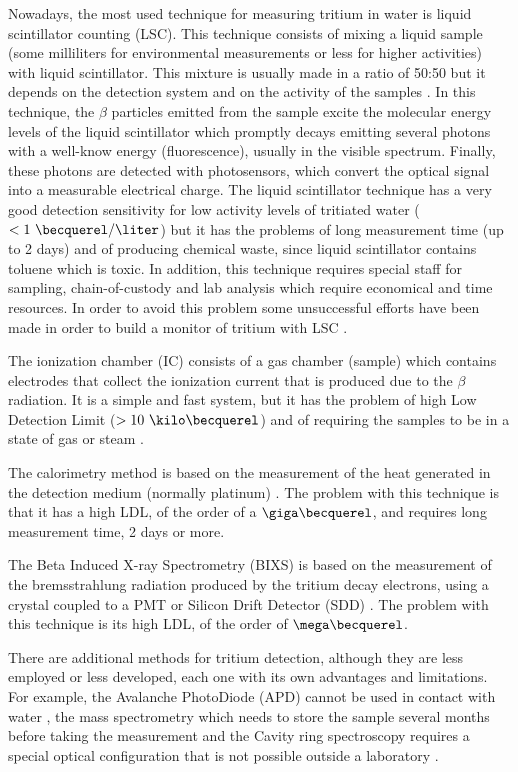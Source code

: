 Nowadays, the most used technique for measuring tritium in water is liquid scintillator counting (LSC). This technique consists of mixing a liquid sample (some milliliters for environmental measurements or less for higher activities) with liquid scintillator. This mixture is usually made in a ratio of 50:50 but it depends on the detection system and on the activity of the samples \cite{LSCothers, HofstetterSeveral}. In this technique, the $\beta$ particles emitted from the sample excite the molecular energy levels of the liquid scintillator which promptly decays emitting several photons with a well-know energy (fluorescence), usually in the visible spectrum. Finally, these photons are detected with photosensors, which convert the optical signal into a measurable electrical charge. The liquid scintillator technique has a very good detection sensitivity for low activity levels of tritiated water ($<1~\becquerel/\liter$) \cite{0.6Bq_L} but it has the problems of long measurement time (up to 2 days) and of producing chemical waste, since liquid scintillator contains toluene which is toxic. In addition, this technique requires special staff for sampling, chain-of-custody and lab analysis which require economical and time resources. In order to avoid this problem some unsuccessful efforts have been made in order to build a monitor of tritium with LSC \cite{OnlineLSC}. 

The ionization chamber (IC) consists of a gas chamber (sample) which contains electrodes that collect the ionization current that is produced due to the $\beta$ radiation. It is a simple and fast system, but it has the problem of high Low Detection Limit ($> 10~\kilo\becquerel$) and of requiring the samples to be in a state of gas or steam \cite{IonizationChamber1, IonizationChamber2}.

The calorimetry method is based on the measurement of the heat generated in the detection medium (normally platinum) \cite{Calorimeter1, Calorimeter2}. The problem with this technique is that it has a high LDL, of the order of a $\giga\becquerel$, and requires long measurement time, 2 days or more.

The Beta Induced X-ray Spectrometry (BIXS) is based on the measurement of the bremsstrahlung radiation produced by the tritium decay electrons, using a  crystal coupled to a PMT  \cite{XRays1, XRays2} or Silicon Drift Detector (SDD) \cite{Bremstrahlung}. The problem with this technique is its high LDL, of the order of $\mega\becquerel$.

There are additional methods for tritium detection, although they are less employed or less developed, each one with its own advantages and limitations. For example, the Avalanche PhotoDiode (APD) cannot be used in contact with water \cite{APD},  the mass spectrometry which needs to store the sample several months before taking the measurement \cite{Spectrometry} and the Cavity ring spectroscopy requires a special optical configuration that is not possible outside a laboratory \cite{Ring}.


